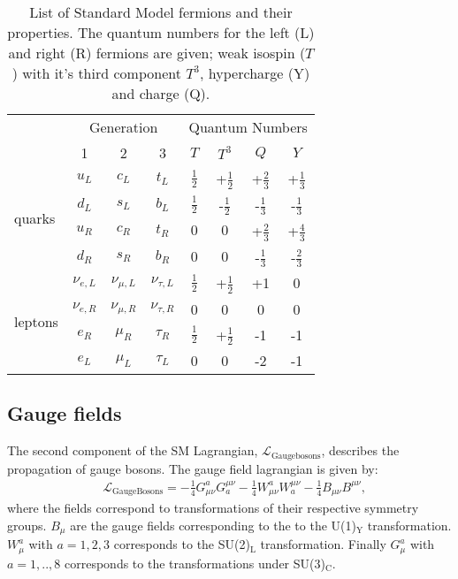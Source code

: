 \begin{table}[htp]
    \centering
    {
    \begin{tabular}{l | c c c | c c c c}
    \toprule
      & \multicolumn{3}{c|}{Generation} &  \multicolumn{4}{c}{Quantum Numbers}  \\
      & 1 & 2 & 3 & $T$ & $T^3$ & $Q$ & $Y$ \\ 
    \hline
    \multirow{4}{*}[0.5em]{quarks} & $u_L$ & $c_L$ & $t_L$ & $\frac{1}{2}$ & +$\frac{1}{2}$ & +$\frac{2}{3}$ & +$\frac{1}{3}$ \\
    & $d_L$ & $s_L$ & $b_L$ & $\frac{1}{2}$ & -$\frac{1}{2}$ & -$\frac{1}{3}$ & -$\frac{1}{3}$ \\
    & $u_R$ & $c_R$ & $t_R$ & $ 0$ & $0$ & +$\frac{2}{3}$ & +$\frac{4}{3}$ \\
    & $d_R$ & $s_R$ & $b_R$ & $ 0$ & $0$ & -$\frac{1}{3}$ & -$\frac{2}{3}$ \\
    \midrule
    \multirow{4}{*}[0.5em]{leptons} & $\nu_{e,L}$ & $\nu_{\mu,L}$ & $\nu_{\tau,L}$ & $\frac{1}{2}$ & +$\frac{1}{2}$ & +1 & 0 \\
    & $\nu_{e,R}$ & $\nu_{\mu,R}$ & $\nu_{\tau,R}$ & 0 & 0 & 0 & 0 \\
        & $e_R$ & $\mu_R$ & $\tau_R$ & $\frac{1}{2}$ & +$\frac{1}{2}$ & -1 & -1 \\
        & $e_L$ & $\mu_L$ & $\tau_L$ & 0 & 0 & -2 & -1 \\
    \bottomrule
    \end{tabular}
    }
    \caption{List of Standard Model fermions and their properties. The quantum numbers for the left (L) and right (R) fermions are given; weak isospin ($T$) with it's third component $T^3$, hypercharge (Y) and charge (Q).}
    \label{tab:fermions}
\end{table}

\subsection{Gauge fields}\label{sec:gaugeFields}
The second component of the SM Lagrangian, $\mathcal{L}_{\mathrm{Gauge bosons}}$, describes the propagation of gauge bosons. The gauge field lagrangian is given by: 
\begin{equation}
    \label{eq:lagrangianGauge}
    \begin{aligned}
        & \mathcal{L}_\mathrm{Gauge Bosons} = -\frac{1}{4}G^a_{\mu\nu}G_a^{\mu\nu} -\frac{1}{4}W^a_{\mu\nu}W_a^{\mu\nu} -\frac{1}{4}B_{\mu\nu}B^{\mu\nu},
    \end{aligned}
\end{equation}
where the fields correspond to transformations of their respective symmetry groups. $B_\mu$  are the gauge fields corresponding to the to the U(1)$_\mathrm{Y}$ transformation. $W_\mu^a$ with $a = 1,2,3$ corresponds to the SU(2)$_\mathrm{L}$ transformation. Finally $G_\mu^a$ with $a = 1,..,8$ corresponds to the transformations under SU(3)$_\mathrm{C}$. 

